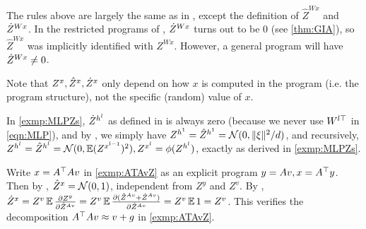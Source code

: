 \documentclass[main.tex]{subfiles}
\begin{document}
The rules above are largely the same as in \cite{yangTP2}, except the definition of $\hat{Z}^{Wx}$ and $\dot Z^{Wx}$. In the restricted \netsort{} programs of \citep{yangTP2}, $\dot Z^{Wx}$ turns out to be 0 (see \cref{thm:GIA}), so $\hat{Z}^{Wx}$ was implicitly identified with $Z^{Wx}$. However, a general \netsort{} program will have $\dot Z^{Wx}\ne0$. 

\begin{rem}
Note that $Z^{x},\hat{Z}^{x},\dot Z^{x}$ only depend on how $x$ is computed in the \netsort{} program (i.e. the program structure), not the specific (random) value of $x$.
\end{rem}

\begin{exmp}
In \cref{exmp:MLPZs}, $\dot Z^{h^l}$ as defined in  is always zero (because we never use $W^{l\top}$ in \cref{eqn:MLP}), and by , we simply have $Z^{h^1} = \hat Z^{h^1} = \mathcal{N}(0, \|\xi\|^2/d)$, and recursively, $Z^{h^l} = \hat Z^{h^l} = \mathcal{N}(0, \operatorname*{\mathbb{E}} (Z^{x^{l-1}})^2), Z^{x^l} = \phi(Z^{h^l})$, exactly as derived in \cref{exmp:MLPZs}.
\end{exmp}

\begin{exmp}\label{exmp:ATAvZdot}
    Write $x = A^\top A v$ in \cref{exmp:ATAvZ} as an explicit \netsort{} program $y = A v, x = A^\top y$.
    Then by , $\hat Z^x = \mathcal{N}(0, 1)$, independent from $Z^y$ and $Z^v$.
    By , $\dot Z^x = Z^v \operatorname*{\mathbb{E}} \frac{\partial Z^y}{\partial \hat Z^{A v}} = Z^v \operatorname*{\mathbb{E}} \frac{\partial (\hat Z^{Av} + \dot Z^{Av})}{\partial \hat Z^{A v}} = Z^v \operatorname*{\mathbb{E}} 1 = Z^v$.
    This verifies the decomposition $A^\top A v \approx v + g$ in \cref{exmp:ATAvZ}.
\end{exmp}
\end{document}
